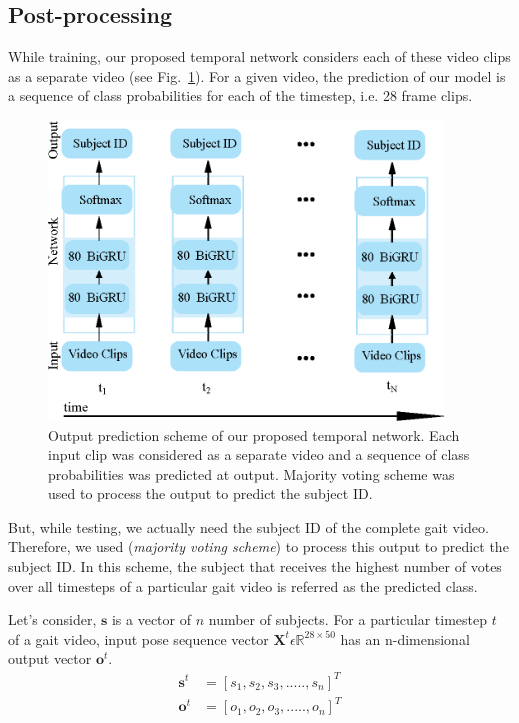 \subsection{Post-processing}\label{sec_3.1.8}
While training, our proposed temporal network considers each of these video clips as a separate video (see Fig.~\ref{fig:output_prediction}). For a given video, the prediction of our model is a sequence of class probabilities for each of the timestep, i.e. 28 frame clips.
\begin{figure}
	\centering
	\includegraphics[width = 105mm]{figures/output_prediction.eps}
	\caption{
		Output prediction scheme of our proposed temporal network. Each input clip was considered as a separate video and a sequence of class probabilities was predicted at output. Majority voting scheme was used to process the output to predict the subject ID.
	}
	\label{fig:output_prediction}
\end{figure}

But, while testing, we actually need the subject ID of the complete gait video. Therefore, we used (\textit {majority voting scheme}) to process this output to predict the subject ID. In this scheme, the subject that receives the highest number of votes over all timesteps of a particular gait video is referred as the predicted class.

Let\rq s consider, $\boldsymbol{s}$ is a vector of $n$ number of subjects. For a particular timestep $t$ of a gait video, input pose sequence vector $\boldsymbol X^t \epsilon \mathbb {R}^{28\times 50}$ has an n-dimensional output vector $\boldsymbol o^t$.
\begin{equation}
\begin{split}
\boldsymbol s^t &=  {[s_1, s_2, s_3, ....., s_{n}]}^{T}\\
\boldsymbol o^t &=  {[o_1, o_2, o_3, ....., o_{n}]}^{T}
\label{equ:equ_5}
\end{split}
\end{equation}

